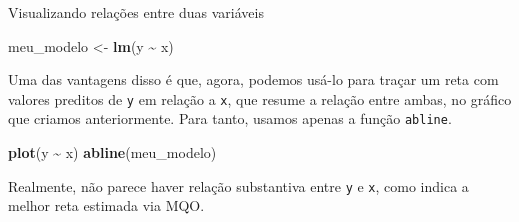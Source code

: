 \documentclass[
  9pt,
  ignorenonframetext,
  aspectratio=169]{beamer}
\newenvironment{Shaded}{\begin{snugshade}}{\end{snugshade}}
\newcommand{\KeywordTok}[1]{\textcolor[rgb]{0.13,0.29,0.53}{\textbf{#1}}}
\newcommand{\NormalTok}[1]{#1}
\newcommand{\OperatorTok}[1]{\textcolor[rgb]{0.81,0.36,0.00}{\textbf{#1}}}
\newcommand{\StringTok}[1]{\textcolor[rgb]{0.31,0.60,0.02}{#1}}
\begin{document}
\begin{frame}[fragile]{Visualizando relações entre duas variáveis}
\begin{Shaded}
\begin{Highlighting}[]
\NormalTok{meu\_modelo \textless{}{-}}\StringTok{ }\KeywordTok{lm}\NormalTok{(y }\OperatorTok{\textasciitilde{}}\StringTok{ }\NormalTok{x)}
\end{Highlighting}
\end{Shaded}

Uma das vantagens disso é que, agora, podemos usá-lo para traçar um reta
com valores preditos de \texttt{y} em relação a \texttt{x}, que resume a
relação entre ambas, no gráfico que criamos anteriormente. Para tanto,
usamos apenas a função \texttt{abline}.

\begin{Shaded}
\begin{Highlighting}[]
\KeywordTok{plot}\NormalTok{(y }\OperatorTok{\textasciitilde{}}\StringTok{ }\NormalTok{x)}
\KeywordTok{abline}\NormalTok{(meu\_modelo)}
\end{Highlighting}
\end{Shaded}

Realmente, não parece haver relação substantiva entre \texttt{y} e
\texttt{x}, como indica a melhor reta estimada via MQO.
\end{frame}
\end{document}
